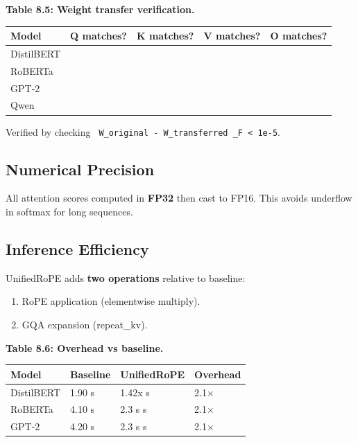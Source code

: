 \textbf{Table 8.5: Weight transfer verification.}

\begin{table}[H]
\centering
\small
\begin{tabular}{lllll}
\toprule
\textbf{Model} & \textbf{Q matches?} & \textbf{K matches?} & \textbf{V matches?} & \textbf{O matches?} \\
\midrule
DistilBERT &  &  &  &  \\
RoBERTa &  &  &  &  \\
GPT-2 &  &  &  &  \\
Qwen &  &  &  &  \\
\bottomrule
\end{tabular}
\end{table}

Verified by checking \texttt{ W\_original - W\_transferred \_F \textless{} 1e-5}.

\subsection{Numerical Precision}

All attention scores computed in \textbf{FP32} then cast to FP16. This avoids 
underflow in softmax for long sequences.

\subsection{Inference Efficiency}

UnifiedRoPE adds \textbf{two operations} relative to baseline:
\begin{enumerate}
\item RoPE application (elementwise multiply).
\item GQA expansion (repeat\_kv).

\end{enumerate}
\textbf{Table 8.6: Overhead vs baseline.}

\begin{table}[H]
\centering
\small
\begin{tabular}{llll}
\toprule
\textbf{Model} & \textbf{Baseline} & \textbf{UnifiedRoPE} & \textbf{Overhead} \\
\midrule
DistilBERT & 1.90 s & 1.42x s & 2.1$\times$ \\
RoBERTa & 4.10 s & 2.3 s s & 2.1$\times$ \\
GPT-2 & 4.20 s & 2.3 s s & 2.1$\times$ \\
\bottomrule
\end{tabular}
\end{table}

